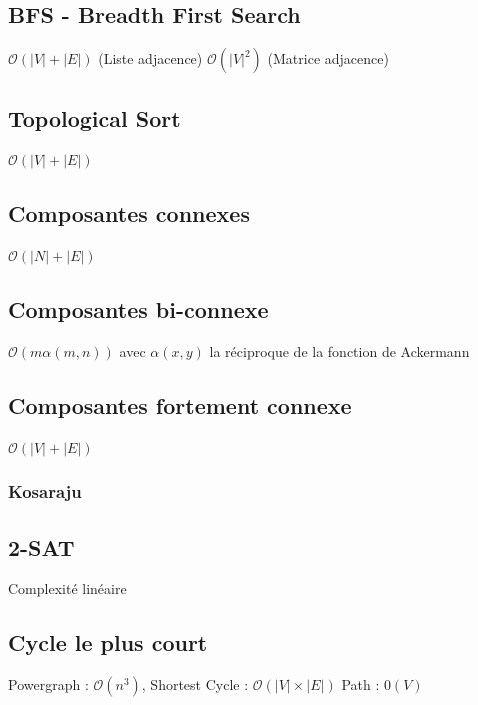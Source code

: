 \documentclass[8pt]{article}
\begin{document}
        \subsection{BFS - Breadth First Search}
        $\mathcal{O}(\lvert V \rvert  + \lvert E \rvert)$ (Liste adjacence) $\mathcal{O}(\lvert V \rvert ^2)$ (Matrice adjacence)
        {\scriptsize}
        \subsection{Topological Sort}
        $\mathcal{O}(\lvert V \rvert  + \lvert E \rvert)$
        {\scriptsize}
        \subsection{Composantes connexes}
        $\mathcal{O}(\lvert N \rvert  + \lvert E \rvert)$
        {\scriptsize}
        \subsection{Composantes bi-connexe}
        $\mathcal{O}(m \alpha(m,n))$ avec $\alpha(x,y)$ la réciproque de la fonction de Ackermann 
        {\scriptsize}
        \subsection{Composantes fortement connexe}
            $\mathcal{O}(\lvert V \rvert  + \lvert E \rvert)$
            \subsubsection{Kosaraju}
            {\scriptsize}
        \subsection{2-SAT}
        Complexité linéaire
        {\scriptsize}
        \subsection{Cycle le plus court}
        Powergraph : $\mathcal{O}(n^3)$, Shortest Cycle : $\mathcal{O}(\lvert V \rvert  \times \lvert E \rvert)$ 
        Path : $\mathcal{0}(V)$
        {\scriptsize}
\end{document}
